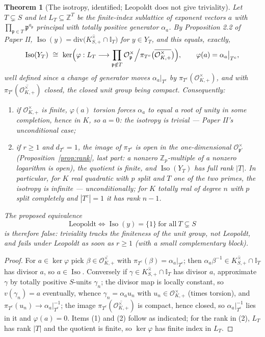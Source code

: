 \documentclass[11pt]{amsart}
\numberwithin{equation}{section}
\newtheorem{theorem}{Theorem}[section]
\theoremstyle{definition}
\theoremstyle{remark}
\newcommand{\Z}{\mathbb{Z}}
\newcommand{\cO}{\mathcal{O}}
\newcommand{\pp}{\mathfrak{p}}
\newcommand{\Iso}{\operatorname{Iso}}
\newcommand{\Idl}{\mathbb{I}}
\begin{document}
\begin{theorem}[The isotropy, identified; Leopoldt does not give triviality]\label{thm:nottrivial}
Let $T\subsetneq S$ and let $L_T\subseteq\Z^T$ be the finite-index sublattice of exponent
vectors $a$ with $\prod_{\pp\in T}\pp^{a_\pp}$ principal with totally positive generator
$\alpha_a$. By Proposition 2.2 of Paper II,
$\Iso(y)=\mathrm{div}\bigl(\overline{K^\times_{S,+}}\cap\Idl_T\bigr)$ for $y\in Y_T$, and
this equals, exactly,
\[
\Iso(Y_T)\ \cong\ \ker\Bigl(\varphi:L_T\longrightarrow
\prod_{\pp\notin T}\cO_\pp^\times\Big/\pi_{T^c}\bigl(\overline{\cO^\times_{K,+}}\bigr)\Bigr),
\qquad \varphi(a)=\alpha_a\big|_{T^c},
\]
well defined since a change of generator moves $\alpha_a|_{T^c}$ by
$\pi_{T^c}(\cO^\times_{K,+})$, and with $\pi_{T^c}(\overline{\cO^\times_{K,+}})$ closed, the
closed unit group being compact. Consequently:
\begin{enumerate}
\item if $\cO^\times_{K,+}$ is finite, $\varphi(a)$ torsion forces $\alpha_a$ to equal a
root of unity in some completion, hence in $K$, so $a=0$: the isotropy is trivial ---
Paper II's unconditional case;
\item if $r\ge1$ and $d_{T^c}=1$, the image of $\pi_{T^c}$ is \emph{open} in the
one-dimensional $\cO_{\pp'}^\times$ (Proposition~\ref{prop:rank}, last part: a nonzero
$\Z_p$-multiple of a nonzero logarithm is open), the quotient is finite, and
$\Iso(Y_T)$ has \emph{full rank} $|T|$. In particular, for $K$ real quadratic with $p$
split and $T$ one of the two primes, the isotropy is infinite --- \emph{unconditionally};
for $K$ totally real of degree $n$ with $p$ split completely and $|T^c|=1$ it has rank
$n-1$.
\end{enumerate}
The proposed equivalence
\[
\text{Leopoldt}\iff\Iso(y)=\{1\}\ \text{for all}\ T\subsetneq S
\]
is therefore false: triviality tracks the finiteness of the unit group, not Leopoldt, and
fails under Leopoldt as soon as $r\ge1$ (with a small complementary block).
\end{theorem}

\begin{proof}
For $a\in\ker\varphi$ pick $\beta\in\overline{\cO^\times_{K,+}}$ with
$\pi_{T^c}(\beta)=\alpha_a|_{T^c}$; then $\alpha_a\beta^{-1}\in
\overline{K^\times_{S,+}}\cap\Idl_T$ has divisor $a$, so $a\in\Iso$. Conversely if
$\gamma\in\overline{K^\times_{S,+}}\cap\Idl_T$ has divisor $a$, approximate $\gamma$ by
totally positive $S$-units $\gamma_n$; the divisor map is locally constant, so
$v(\gamma_n)=a$ eventually, whence $\gamma_n=\alpha_au_n$ with
$u_n\in\cO^\times_{K,+}$ (times torsion), and $\pi_{T^c}(u_n)\to\alpha_a|_{T^c}^{-1}$; the
image $\pi_{T^c}(\overline{\cO^\times_{K,+}})$ is compact, hence closed, so
$\alpha_a|_{T^c}^{-1}$ lies in it and $\varphi(a)=0$. Items (1) and (2) follow as indicated;
for the rank in (2), $L_T$ has rank $|T|$ and the quotient is finite, so
$\ker\varphi$ has finite index in $L_T$.
\end{proof}
\end{document}
